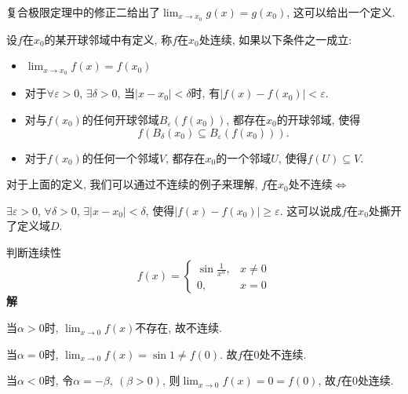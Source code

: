 
复合极限定理中的修正二给出了$\lim_{x \to x_0} g\left( x \right) = g\left( x_0 \right) $, 这可以给出一个定义.

\begin{definition}
    设$f$在$x_0$的某开球邻域中有定义, 称$f$在$x_0$处连续, 如果以下条件之一成立:
    \begin{itemize}
        \item $\displaystyle \lim_{x \to x_0} f\left( x \right) = f\left( x_0 \right) $
        
        \item 对于$\forall \varepsilon > 0$, $\exists \delta > 0$, 当$\left| x - x_0 \right| < \delta$时, 有$\left| f\left( x \right) - f\left( x_0 \right)  \right| < \varepsilon$.
        
        \item 对与$f\left( x_0 \right) $的任何开球邻域$B_{\varepsilon}\left( f\left( x_0 \right)  \right) $, 都存在$x_0$的开球邻域, 使得
        \begin{equation}
            f\left( B_{\delta} \left( x_0 \right) \subseteq B_{\varepsilon}\left( f\left( x_0 \right)  \right)  \right).
        \end{equation}

        \item 对于$f \left( x_0 \right) $的任何一个邻域$V$, 都存在$x_0$的一个邻域$U$, 使得$f \left( U \right) \subseteq V$.
    \end{itemize}
\end{definition}
对于上面的定义, 我们可以通过不连续的例子来理解, $f$在$x_0$处不连续$\iff$

$\exists \varepsilon > 0$, $\forall \delta > 0$, $\exists \left| x - x_0 \right| < \delta $, 使得$\left| f\left( x \right) - f\left( x_0 \right)  \right| \geq \varepsilon$. 这可以说成$f$在$x_0$处撕开了定义域$D$.

\begin{example}
    判断连续性
    \begin{equation}
      f \left( x \right)  = \begin{cases} 
        \sin \frac{1}{x^{\alpha}}, & x \neq 0 
        \\ 
        0, & x = 0
      \end{cases}
    \end{equation}
    \textbf{解}

    当$\alpha > 0$时, $\lim_{x \to 0} f\left( x \right) $不存在, 故不连续.

    当$\alpha = 0$时, $\lim_{x \to 0} f \left( x \right) = \sin 1 \neq f \left( 0 \right) $. 故$f$在$0$处不连续.

    当$\alpha < 0$时, 令$\alpha = - \beta, \ (\beta > 0 )$, 则$\lim_{x \to 0} f \left( x \right) = 0 = f\left( 0 \right) $, 故$f$在$0$处连续.
\end{example}

